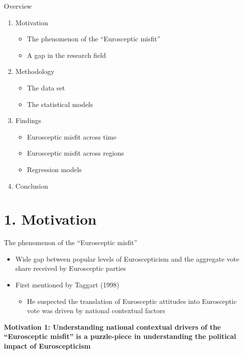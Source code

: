 \begin{frame}{Overview}

\begin{enumerate}
\def\labelenumi{\arabic{enumi}.}
\tightlist
\item
  Motivation

  \begin{itemize}
  \tightlist
  \item
    The phenomenon of the ``Eurosceptic misfit''
  \item
    A gap in the research field
  \end{itemize}
\item
  Methodology

  \begin{itemize}
  \tightlist
  \item
    The data set
  \item
    The statistical models
  \end{itemize}
\item
  Findings

  \begin{itemize}
  \tightlist
  \item
    Eurosceptic misfit across time
  \item
    Eurosceptic misfit across regions
  \item
    Regression models
  \end{itemize}
\item
  Conclusion
\end{enumerate}

\end{frame}

\section{1. Motivation}\label{motivation}

\begin{frame}{The phenomenon of the ``Eurosceptic misfit''}

\begin{itemize}
\tightlist
\item
  Wide gap between popular levels of Euroscepticism and the aggregate
  vote share received by Eurosceptic parties
\item
  First mentioned by Taggart (1998)

  \begin{itemize}
  \tightlist
  \item
    He suspected the translation of Eurosceptic attitudes into
    Eurosceptic vote was driven by national contextual factors
  \end{itemize}
\end{itemize}

\textbf{Motivation 1: Understanding national contextual drivers of the
``Eurosceptic misfit'' is a puzzle-piece in understanding the political
impact of Euroscepticism}

\end{frame}

